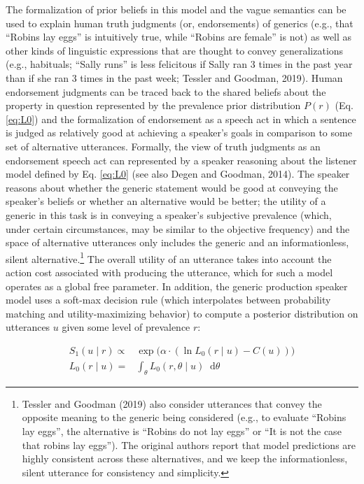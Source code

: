 \documentclass[floatsintext,doc]{apa6}
\let\rmarkdownfootnote\footnote%
\def\footnote{\protect\rmarkdownfootnote}
\newcommand*\diff{\mathop{}\!\mathrm{d}}
\begin{document}
 The formalization of prior beliefs in this model and the vague semantics can be used to explain human truth judgments (or, endorsements) of generics (e.g., that ``Robins lay eggs'' is intuitively true, while ``Robins are female'' is not) as well as other kinds of linguistic expressions that are thought to convey generalizations (e.g., habituals;  ``Sally runs'' is less felicitous if Sally ran 3 times in the past year than if she ran 3 times in the past week; Tessler and Goodman, 2019).
Human endorsement judgments can be traced back to the shared beliefs about the property in question represented by the prevalence prior distribution $P(r)$ (Eq. \ref{eq:L0}) and the formalization of endorsement as a speech act in which a sentence is judged as relatively good at achieving a speaker's goals in comparison to some set of alternative utterances. 
Formally, the view of truth judgments as an endorsement speech act can represented by a speaker reasoning about the listener model defined by Eq. \ref{eq:L0} (see also Degen and Goodman, 2014).
The speaker reasons about whether the generic statement would be good at conveying the speaker's beliefs or whether an alternative would be better; the utility of a generic in this task is in conveying a speaker's subjective prevalence (which, under certain circumstances, may be similar to the objective frequency) and the space of alternative utterances only includes the generic and an informationless, silent alternative.\footnote{
Tessler and Goodman (2019) also consider utterances that convey the opposite meaning to the generic being considered (e.g., to evaluate ``Robins lay eggs'', the alternative is ``Robins do not lay eggs'' or ``It is not the case that robins lay eggs''). The original authors report that model predictions are highly consistent across these alternatives, and we keep the informationless, silent utterance for consistency and simplicity. 
}
The overall utility of an utterance takes into account the action cost associated with producing the utterance, which for such a model operates as a global free parameter.
In addition, the generic production speaker model uses a soft-max decision rule (which interpolates between probability matching and utility-maximizing behavior) to compute a posterior distribution on utterances $u$ given some level of prevalence $r$:

\begin{align}
S_1(u \mid r) \propto &\exp{(\alpha \cdot ( \ln L_0(r \mid u) - C(u))}) \label{eq:S1} \\
L_0(r \mid u) = &\int_\theta L_0(r, \theta \mid u) \diff\theta
\end{align}
\end{document}
